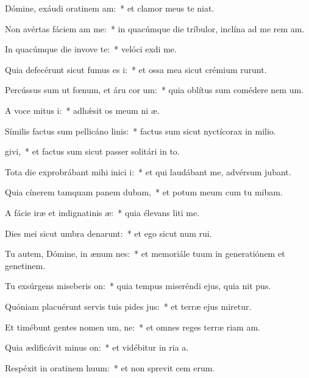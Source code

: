 \item Dómine, exáudi oratinem am:~* et clamor meus  te niat.
\item Non avértas fáciem am  me:~* in quacúmque die tríbulor, inclína ad me rem am.
\item In quacúmque die invove te:~* velóci exdi me.
\item Quia defecérunt sicut fumus es i:~* et ossa mea sicut crémium rurunt.
\item Percússus sum ut fœnum, et áru cor um:~* quia oblítus sum comédere nem um.
\item A voce mitus i:~* adhǽsit os meum ni æ.
\item Símilis factus sum pellicáno linis:~* factus sum sicut nyctícorax in milio.
\item {}givi,~* et factus sum sicut passer solitári in to.
\item Tota die exprobrábant mihi inici i:~* et qui laudábant me, advérsum  jubant.
\item Quia cínerem tamquam panem dubam,~* et potum meum cum tu mibam.
\item A fácie iræ et indignatinis æ:~* quia élevans liti me.
\item Dies mei sicut umbra denarunt:~* et ego sicut num rui.
\item Tu autem, Dómine, in ænum nes:~* et memoriále tuum in generatiónem et genetinem.
\item Tu exsúrgens miseberis on:~* quia tempus miseréndi ejus, quia nit pus.
\item Quóniam placuérunt servis tuis pides jus:~* et terræ ejus miretur.
\item Et timébunt gentes nomen um, ne:~* et omnes reges terræ riam am.
\item Quia ædificávit minus on:~* et vidébitur in ria a.
\item Respéxit in oratinem huum:~* et non sprevit cem erum.

